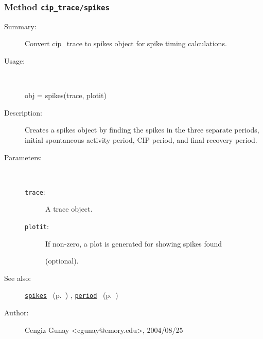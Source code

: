 \subsubsection[Method \texttt{spikes}]{Method \texttt{cip\_trace/spikes}}%
%
\label{ref_cip_trace__spikes}%
\hypertarget{ref_cip_trace__spikes}{}%
\begin{description}
\item[Summary:]Convert cip\_trace to spikes object for spike timing calculations.
%
\item[Usage:]~%
\begin{lyxcode}%
obj = spikes(trace, plotit)
%
\end{lyxcode}%
%
\item[Description:]%
Creates a spikes object by finding the spikes in the three 
 separate periods, initial spontaneous activity period, CIP period, and
 final recovery period.
\item[Parameters:]~
\begin{description}%
\item[\texttt{trace}:]
 A trace object.
\item[\texttt{plotit}:]
 If non-zero, a plot is generated for showing spikes found

(optional).\end{description}%
%
%
%
\item[See also:]%
\hyperlink{ref_spikes}{\texttt{spikes}}%
\ (p.~\pageref{ref_spikes})%
%
, \hyperlink{ref_period}{\texttt{period}}%
\ (p.~\pageref{ref_period})%
%
%
\item[Author:]%
Cengiz Gunay <cgunay@emory.edu>, 2004/08/25%
\end{description}
\methodline%
